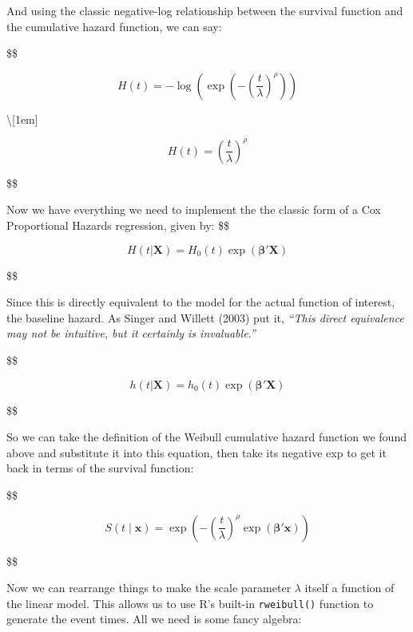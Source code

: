 \documentclass[
  letterpaper,
  DIV=11,
  numbers=noendperiod]{scrreprt}
\begin{document}
And using the classic negative-log relationship between the survival
function and the cumulative hazard function, we can say:

\$\$

\begin{equation}
H(t) = -\log\left(\exp\left(-\left(\frac{t}{\lambda}\right)^{\rho}\right)\right)
\end{equation}

\textbackslash{[}1em{]}

\begin{equation}
H(t) = \left(\frac{t}{\lambda}\right)^{\rho}
\end{equation}

\$\$

Now we have everything we need to implement the the classic form of a
Cox Proportional Hazards regression, given by: \$\$

\begin{equation}
H(t | \mathbf{X}) = H_0(t) \exp(\mathbf{\beta}' \mathbf{X})
\end{equation}

\$\$

Since this is directly equivalent to the model for the actual function
of interest, the baseline hazard. As Singer and Willett (2003) put it,
\emph{``This direct equivalence may not be intuitive, but it certainly
is invaluable.''}

\$\$

\begin{equation}
h(t | \mathbf{X}) = h_0(t) \exp(\mathbf{\beta}' \mathbf{X})
\end{equation}

\$\$

So we can take the definition of the Weibull cumulative hazard function
we found above and substitute it into this equation, then take its
negative exp to get it back in terms of the survival function:

\$\$

\begin{equation}
S(t \mid \mathbf{x}) = \exp\left(-\left(\frac{t}{\lambda}\right)^{\rho} \exp(\mathbf{\beta}' \mathbf{x})\right)
\end{equation}

\$\$

Now we can rearrange things to make the scale parameter \(\lambda\)
itself a function of the linear model. This allows us to use R's
built-in \texttt{rweibull()} function to generate the event times. All
we need is some fancy algebra:
\end{document}
